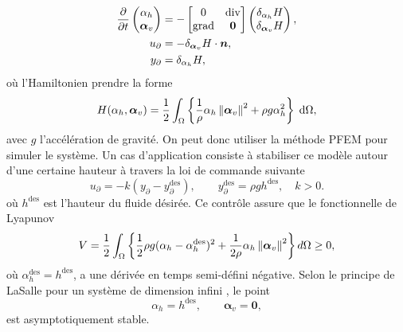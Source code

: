 \begin{equation*}
\begin{aligned}
\diffp{}{t}
\begin{pmatrix}
\alpha_h \\
\bm{\alpha}_v \\
\end{pmatrix} &= -
\begin{bmatrix}
0 & \div \\
\grad & \bm{0}
\end{bmatrix}
\begin{pmatrix}
\delta_{\alpha_h} H\\
\delta_{\bm{\alpha}_v} H
\end{pmatrix},  \\
{u}_\partial &= - \delta_{\bm{\alpha}_v} H \cdot\bm{n}, \\
{y}_\partial &= \delta_{\alpha_h} H, \\
\end{aligned} 
\end{equation*}
où l'Hamiltonien prendre la forme
\begin{equation*}
H(\alpha_h, \bm{\alpha}_v) = \energy{\frac{1}{\rho} \alpha_h \norm{\bm{\alpha}_v}^2 + \rho g \alpha_h^2},
\end{equation*}
avec $g$ l'accélération de gravité. On peut donc utiliser la méthode PFEM pour simuler le système. Un cas d'application consiste à stabiliser ce modèle autour d'une certaine hauteur à travers la loi de commande suivante
\begin{equation*}
u_\partial = -k (y_\partial - y_\partial^{\text{des}}), \qquad y_\partial^{\text{des}}= \rho g h^{\text{des}}, \quad k>0.
\end{equation*}
où $h^{\text{des}}$ est l'hauteur du fluide désirée. Ce contrôle assure que le fonctionnelle de Lyapunov 
\begin{equation*}
V = \frac{1}{2} \int_{\Omega}\left\{\frac{1}{2} \rho g (\alpha_h - \alpha_h^{\text{des}})^2 + \frac{1}{2\rho} \alpha_h \left\|\bm{\alpha}_v\right\|^2 \right\} d\Omega \ge 0,
\end{equation*}
où $\alpha_h^{\text{des}} = h^{\text{des}} $, a une dérivée en temps semi-défini négative. Selon le principe de LaSalle pour un système de dimension infini \cite{henry2006geometric}, le point
\begin{equation*}
\alpha_h = h^{\text{des}}, \qquad \bm{\alpha}_v = \bm{0},
\end{equation*}
est asymptotiquement stable. \\

